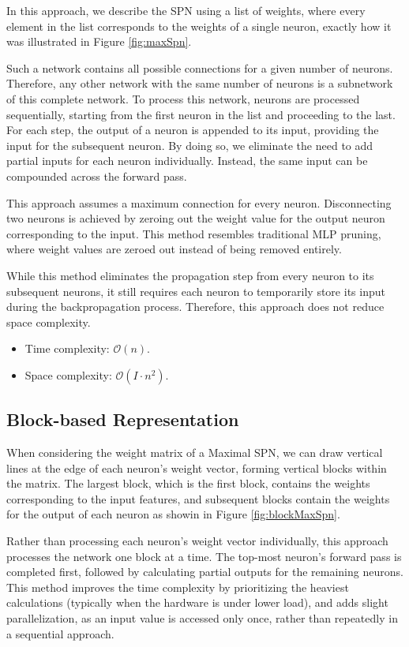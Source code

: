In this approach, we describe the SPN using a list of weights, where every element in the list corresponds to the weights of a single neuron, exactly how it was illustrated in Figure \ref{fig:maxSpn}.
 
Such a network contains all possible connections for a given number of neurons. Therefore, any other network with the same number of neurons is a subnetwork of this complete network. To process this network, neurons are processed sequentially, starting from the first neuron in the list and proceeding to the last. For each step, the output of a neuron is appended to its input, providing the input for the subsequent neuron. By doing so, we eliminate the need to add partial inputs for each neuron individually. Instead, the same input can be compounded across the forward pass.

This approach assumes a maximum connection for every neuron. Disconnecting two neurons is achieved by zeroing out the weight value for the output neuron corresponding to the input. This method resembles traditional MLP pruning, where weight values are zeroed out instead of being removed entirely.

While this method eliminates the propagation step from every neuron to its subsequent neurons, it still requires each neuron to temporarily store its input during the backpropagation process. Therefore, this approach does not reduce space complexity.

\begin{itemize}
    \item Time complexity: $\mathcal{O}(n)$.
    \item Space complexity: $\mathcal{O}(I \cdot n^2)$.
\end{itemize}

\subsection{Block-based Representation}

When considering the weight matrix of a Maximal SPN, we can draw vertical lines at the edge of each neuron’s weight vector, forming vertical blocks within the matrix. The largest block, which is the first block, contains the weights corresponding to the input features, and subsequent blocks contain the weights for the output of each neuron as showin in Figure \ref{fig:blockMaxSpn}.
 
Rather than processing each neuron’s weight vector individually, this approach processes the network one block at a time. The top-most neuron’s forward pass is completed first, followed by calculating partial outputs for the remaining neurons. This method improves the time complexity by prioritizing the heaviest calculations (typically when the hardware is under lower load), and adds slight parallelization, as an input value is accessed only once, rather than repeatedly in a sequential approach.

